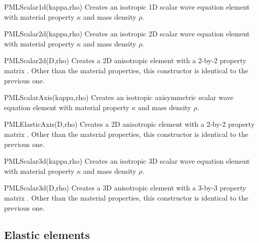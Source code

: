 \begin{codelist}

  \item[PMLScalar1d(kappa,rho)] 
    Creates an isotropic 1D scalar wave equation element with material
    property $\kappa$ and mass density $\rho$.  

  \item[PMLScalar2d(kappa,rho)] 
    Creates an isotropic 2D scalar wave equation element with material
    property $\kappa$ and mass density $\rho$. 

  \item[PMLScalar2d(D,rho)]
    Creates a 2D anisotropic element with a 2-by-2 property matrix
    .  Other than the material properties, this constructor is
    identical to the previous one.

  \item[PMLScalarAxis(kappa,rho)]
    Creates an isotropic axisymmetric scalar wave equation element
    with material property $\kappa$ and mass density $\rho$.  

  \item[PMLElasticAxis(D,rho)]
    Creates a 2D anisotropic element with a 2-by-2 property matrix
    .  Other than the material properties, this constructor is
    identical to the previous one.

  \item[PMLScalar3d(kappa,rho)] 
    Creates an isotropic 3D scalar wave equation element with material
    property $\kappa$ and mass density $\rho$.  

  \item[PMLScalar3d(D,rho)]
    Creates a 3D anisotropic element with a 3-by-3 property matrix
    .  Other than the material properties, this constructor is
    identical to the previous one.

\end{codelist}

\clearpage
\subsection{Elastic elements}

